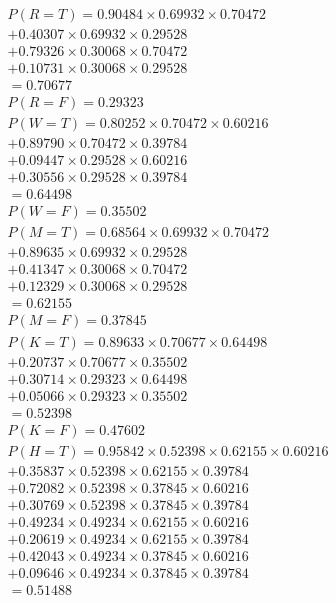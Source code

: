 \documentclass{university}
\begin{document}
\subsubsection{}
\begin{gather*}
    P(R=T) = 0.90484 \times 0.69932 \times 0.70472 \\
    + 0.40307 \times 0.69932 \times 0.29528 \\
    + 0.79326 \times 0.30068 \times 0.70472 \\
    + 0.10731 \times 0.30068 \times 0.29528 \\
    = 0.70677 \\
    P(R=F) = 0.29323 \\
    P(W=T) = 0.80252 \times 0.70472 \times 0.60216 \\
    + 0.89790 \times 0.70472 \times 0.39784 \\
    + 0.09447 \times 0.29528 \times 0.60216 \\
    + 0.30556 \times 0.29528 \times 0.39784 \\
    = 0.64498 \\
    P(W=F) = 0.35502 \\
    P(M=T) = 0.68564 \times 0.69932 \times 0.70472 \\
    + 0.89635 \times 0.69932 \times 0.29528 \\
    + 0.41347 \times 0.30068 \times 0.70472 \\
    + 0.12329 \times 0.30068 \times 0.29528 \\
    = 0.62155 \\
    P(M=F) = 0.37845 \\
    P(K=T) = 0.89633 \times 0.70677 \times 0.64498 \\
    + 0.20737 \times 0.70677 \times 0.35502 \\
    + 0.30714 \times 0.29323 \times 0.64498 \\
    + 0.05066 \times 0.29323 \times 0.35502 \\
    = 0.52398 \\
    P(K=F) = 0.47602 \\
    P(H=T) = 0.95842 \times 0.52398 \times 0.62155 \times 0.60216 \\
    + 0.35837 \times 0.52398 \times 0.62155 \times 0.39784 \\
    + 0.72082 \times 0.52398 \times 0.37845 \times 0.60216 \\
    + 0.30769 \times 0.52398 \times 0.37845 \times 0.39784 \\
    + 0.49234 \times 0.49234 \times 0.62155 \times 0.60216 \\
    + 0.20619 \times 0.49234 \times 0.62155 \times 0.39784 \\
    + 0.42043 \times 0.49234 \times 0.37845 \times 0.60216 \\
    + 0.09646 \times 0.49234 \times 0.37845 \times 0.39784 \\
    = 0.51488
\end{gather*}
\end{document}

